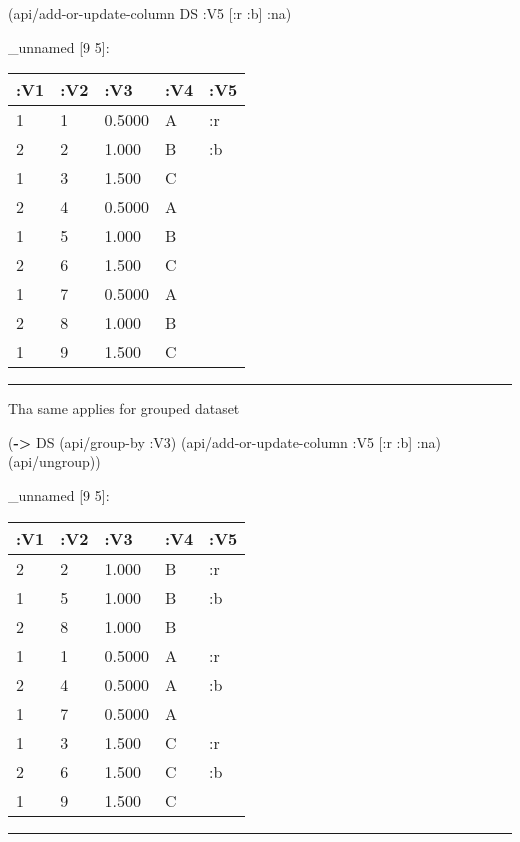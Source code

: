 \documentclass[]{article}
\newenvironment{Shaded}{\begin{snugshade}}{\end{snugshade}}
\newcommand{\KeywordTok}[1]{\textcolor[rgb]{0.13,0.29,0.53}{\textbf{#1}}}
\newcommand{\AttributeTok}[1]{\textcolor[rgb]{0.77,0.63,0.00}{#1}}
\newcommand{\NormalTok}[1]{#1}
\begin{document}
\begin{Shaded}
\begin{Highlighting}[]
\NormalTok{(api/add-or-update-column DS }\AttributeTok{:V5}\NormalTok{ [}\AttributeTok{:r} \AttributeTok{:b}\NormalTok{] }\AttributeTok{:na}\NormalTok{)}
\end{Highlighting}
\end{Shaded}

\_unnamed {[}9 5{]}:

\begin{longtable}[]{@{}lllll@{}}
\toprule
:V1 & :V2 & :V3 & :V4 & :V5\tabularnewline
\midrule
\endhead
1 & 1 & 0.5000 & A & :r\tabularnewline
2 & 2 & 1.000 & B & :b\tabularnewline
1 & 3 & 1.500 & C &\tabularnewline
2 & 4 & 0.5000 & A &\tabularnewline
1 & 5 & 1.000 & B &\tabularnewline
2 & 6 & 1.500 & C &\tabularnewline
1 & 7 & 0.5000 & A &\tabularnewline
2 & 8 & 1.000 & B &\tabularnewline
1 & 9 & 1.500 & C &\tabularnewline
\bottomrule
\end{longtable}

\begin{center}\rule{0.5\linewidth}{0.5pt}\end{center}

Tha same applies for grouped dataset

\begin{Shaded}
\begin{Highlighting}[]
\NormalTok{(}\KeywordTok{->}\NormalTok{ DS}
\NormalTok{    (api/group-by }\AttributeTok{:V3}\NormalTok{)}
\NormalTok{    (api/add-or-update-column }\AttributeTok{:V5}\NormalTok{ [}\AttributeTok{:r} \AttributeTok{:b}\NormalTok{] }\AttributeTok{:na}\NormalTok{)}
\NormalTok{    (api/ungroup))}
\end{Highlighting}
\end{Shaded}

\_unnamed {[}9 5{]}:

\begin{longtable}[]{@{}lllll@{}}
\toprule
:V1 & :V2 & :V3 & :V4 & :V5\tabularnewline
\midrule
\endhead
2 & 2 & 1.000 & B & :r\tabularnewline
1 & 5 & 1.000 & B & :b\tabularnewline
2 & 8 & 1.000 & B &\tabularnewline
1 & 1 & 0.5000 & A & :r\tabularnewline
2 & 4 & 0.5000 & A & :b\tabularnewline
1 & 7 & 0.5000 & A &\tabularnewline
1 & 3 & 1.500 & C & :r\tabularnewline
2 & 6 & 1.500 & C & :b\tabularnewline
1 & 9 & 1.500 & C &\tabularnewline
\bottomrule
\end{longtable}

\begin{center}\rule{0.5\linewidth}{0.5pt}\end{center}
\end{document}
